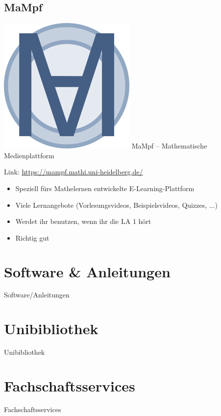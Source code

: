 \subsection{MaMpf}
\begin{frame}{\includegraphics[scale=0.072]{images/mampf.png} MaMpf -- Mathematische Medienplattform}

    Link: \url{https://mampf.mathi.uni-heidelberg.de/}

    \begin{center}
    \end{center}

    \begin{itemize}
          \item Speziell fürs Mathelernen entwickelte E-Learning-Plattform
          \item Viele Lernangebote (Vorlesungsvideos, Beispielsvideos, Quizzes, ...)
          \item Werdet ihr benutzen, wenn ihr die LA 1 hört
          \item Richtig gut
    \end{itemize}

\end{frame}


\section{Software \& Anleitungen}
\begin{frame}{Software/Anleitungen}
\end{frame}


\section{Unibibliothek}
\begin{frame}{Unibibliothek}
\end{frame}


\section{Fachschaftsservices}
\begin{frame}{Fachschaftsservices}
\end{frame}



